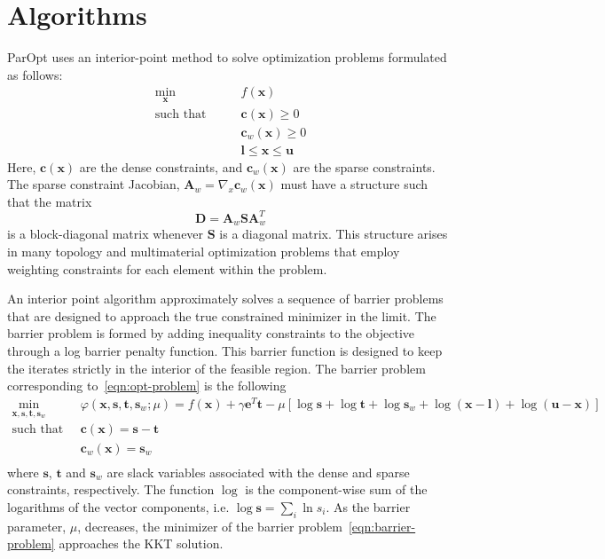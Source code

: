 \documentclass[12pt]{article}
\newcommand{\mb}{\mathbf}
\begin{document}
\section{Algorithms}

ParOpt uses an interior-point method to solve optimization problems formulated as follows:
\begin{equation}
  \label{eqn:opt-problem}
  \begin{aligned}
    \min_{\mb{x}} \qquad & f(\mb{x}) \\
    \text{such that} \qquad 
    & \mb{c}(\mb{x}) \ge 0 \\
    & \mb{c}_{w}(\mb{x}) \ge 0 \\
    & \mb{l} \le \mb{x} \le \mb{u}
  \end{aligned}
\end{equation}
Here, $\mb{c}(\mb{x})$ are the dense constraints, and $\mb{c}_{w}(\mb{x})$ are the sparse constraints. 
The sparse constraint Jacobian, $\mb{A}_{w} = \nabla_{x} \mb{c}_{w}(\mb{x})$ must have a structure such that the matrix
\begin{equation*}
  \mb{D} = \mb{A}_{w}\mb{S}\mb{A}_{w}^{T}
\end{equation*}
is a block-diagonal matrix whenever $\mb{S}$ is a diagonal matrix. 
This structure arises in many topology and multimaterial optimization problems that employ weighting constraints for each element within the problem. 

An interior point algorithm approximately solves a sequence of barrier problems that are designed to approach the true constrained minimizer in the limit.
The barrier problem is formed by adding inequality constraints to the objective through a log barrier penalty function. 
This barrier function is designed to keep the iterates strictly in the interior of the feasible region. 
The barrier problem corresponding to~\eqref{eqn:opt-problem} is the following
\begin{equation}
  \label{eqn:barrier-problem}
  \begin{aligned}
    \min_{\mb{x}, \mb{s}, \mb{t}, \mb{s}_{w}} \qquad &  \varphi(\mb{x}, \mb{s}, \mb{t}, \mb{s}_{w}; \mu) = f(\mb{x}) + \gamma \mb{e}^{T}\mb{t} - \mu \left[ \log \mb{s} + \log \mb{t} + \log \mb{s}_{w} + \log (\mb{x} - \mb{l}) + \log (\mb{u} - \mb{x})  \right] \\
    \text{such that} \qquad & \mb{c}(\mb{x}) = \mb{s} - \mb{t} \\
    & \mb{c}_{w}(\mb{x}) = \mb{s}_{w} \\
  \end{aligned}
\end{equation}
where $\mb{s}$, $\mb{t}$ and $\mb{s}_{w}$ are slack variables associated with the dense and sparse constraints, respectively. 
The function $\log$ is the component-wise sum of the logarithms of the vector components, i.e. $\log \mb{s} = \sum_{i} \ln s_{i}$.
As the barrier parameter, $\mu$, decreases, the minimizer of the barrier problem~\eqref{eqn:barrier-problem} approaches the KKT solution.
\end{document}
